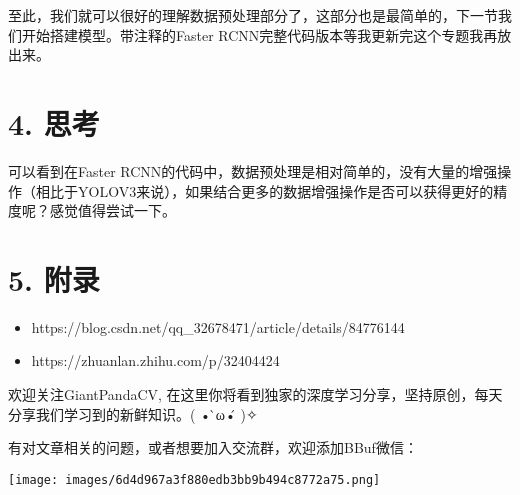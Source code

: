 \documentclass{article}
\begin{document}
至此，我们就可以很好的理解数据预处理部分了，这部分也是最简单的，下一节我们开始搭建模型。带注释的Faster RCNN完整代码版本等我更新完这个专题我再放出来。


\section{4. 思考}


可以看到在Faster RCNN的代码中，数据预处理是相对简单的，没有大量的增强操作（相比于YOLOV3来说），如果结合更多的数据增强操作是否可以获得更好的精度呢？感觉值得尝试一下。


\section{5. 附录}


\begin{itemize}
\item
https://blog.csdn.net/qq\_32678471/article/details/84776144
\item
https://zhuanlan.zhihu.com/p/32404424
\end{itemize}





欢迎关注GiantPandaCV, 在这里你将看到独家的深度学习分享，坚持原创，每天分享我们学习到的新鲜知识。( • ̀ω•́ )✧


有对文章相关的问题，或者想要加入交流群，欢迎添加BBuf微信：


\begin{center}
\vspace{\baselineskip}\texttt{[image: images/6d4d967a3f880edb3bb9b494c8772a75.png]}\vspace{\baselineskip}
\end{center}
\end{document}
